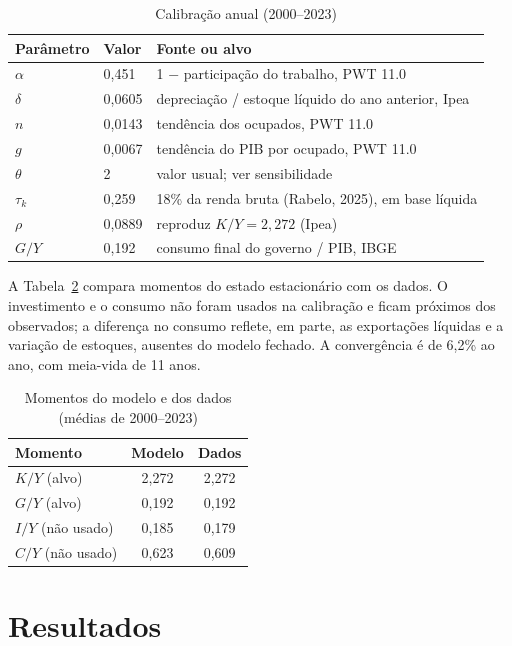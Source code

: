 \documentclass[11pt,a4paper]{article}
\begin{document}
\begin{table}[ht]
\centering
\caption{Calibração anual (2000--2023)}
\label{tab:calibracao}
\begin{tabular}{llp{9cm}}
\toprule
Parâmetro & Valor & Fonte ou alvo\\
\midrule
$\alpha$ & 0,451 & 1 $-$ participação do trabalho, PWT 11.0\\
$\delta$ & 0,0605 & depreciação / estoque líquido do ano anterior, Ipea\\
$n$ & 0,0143 & tendência dos ocupados, PWT 11.0\\
$g$ & 0,0067 & tendência do PIB por ocupado, PWT 11.0\\
$\theta$ & 2 & valor usual; ver sensibilidade\\
$\tau_k$ & 0,259 & 18\% da renda bruta (Rabelo, 2025), em base líquida\\
$\rho$ & 0,0889 & reproduz $K/Y=2{,}272$ (Ipea)\\
$G/Y$ & 0,192 & consumo final do governo / PIB, IBGE\\
\bottomrule
\end{tabular}
\end{table}

A Tabela~\ref{tab:momentos} compara momentos do estado estacionário com os
dados. O investimento e o consumo não foram usados na calibração e ficam
próximos dos observados; a diferença no consumo reflete, em parte, as
exportações líquidas e a variação de estoques, ausentes do modelo fechado.
A convergência é de 6,2\% ao ano, com meia-vida de 11 anos.

\begin{table}[ht]
\centering
\caption{Momentos do modelo e dos dados (médias de 2000--2023)}
\label{tab:momentos}
\begin{tabular}{lcc}
\toprule
Momento & Modelo & Dados\\
\midrule
$K/Y$ (alvo) & 2,272 & 2,272\\
$G/Y$ (alvo) & 0,192 & 0,192\\
$I/Y$ (não usado) & 0,185 & 0,179\\
$C/Y$ (não usado) & 0,623 & 0,609\\
\bottomrule
\end{tabular}
\end{table}

\section{Resultados}
\end{document}
